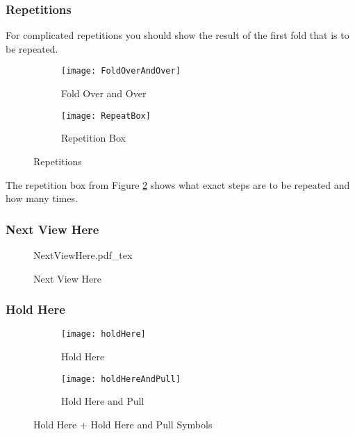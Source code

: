\subsubsection*{Repetitions }

\noindent For complicated repetitions you should show the result of the first fold that is to be repeated.



\begin{figure*}[htbp]
    \centering
    \begin{subfigure}{0.4\textwidth}
        \texttt{[image: FoldOverAndOver]}
        \caption{Fold Over and Over}
        \label{fig:foldOverAndOver}
    \end{subfigure}
    \begin{subfigure}{0.4\textwidth}
	\texttt{[image: RepeatBox]}
	\caption{Repetition Box}
	\label{fig:repeatBox}
    \end{subfigure}
    \caption{Repetitions}
    \label{fig:holdHerePlusPull}
\end{figure*}

\noindent The repetition box from Figure \ref{fig:repeatBox} shows what exact steps are to be repeated and how many times.

\subsubsection*{Next View Here}
\begin{figure}[htbp]
	\centering
	\def\svgwidth{0.6\textwidth}
	{NextViewHere.pdf_tex}
	\caption{Next View Here}
	\label{fig:nextViewHere}
\end{figure}

\subsubsection*{Hold Here}
\begin{figure*}[htbp]
    \centering
    \begin{subfigure}{0.3\textwidth}
        \texttt{[image: holdHere]}
        \caption{Hold Here}
        \label{fig:holdHere}
    \end{subfigure}
    \begin{subfigure}{0.3\textwidth}
        \texttt{[image: holdHereAndPull]}
        \caption{Hold Here and Pull}
        \label{fig:holdHereAndPull}
    \end{subfigure}
    \caption{Hold Here + Hold Here and Pull Symbols}
    \label{fig:holdHerePlusPull}
\end{figure*}

